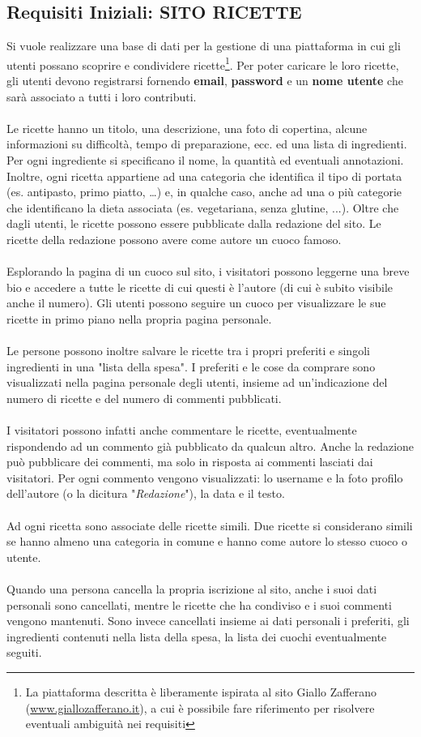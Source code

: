 \documentclass[12pt]{extarticle}
\begin{document}
\subsection{Requisiti Iniziali: SITO RICETTE}
Si vuole realizzare una base di dati per la gestione di una piattaforma in cui gli utenti possano
scoprire e condividere ricette\footnote{La piattaforma descritta è liberamente ispirata al sito Giallo Zafferano 
(\url{www.giallozafferano.it}), a cui è possibile fare riferimento per risolvere eventuali ambiguità nei requisiti}.
Per poter caricare le loro ricette, gli utenti devono registrarsi
fornendo \textbf{email}, \textbf{password} e un \textbf{nome utente} che sarà associato a tutti i loro contributi.
\\\\
Le ricette hanno un titolo, una descrizione, una foto di copertina, alcune informazioni su difficoltà,
tempo di preparazione, ecc. ed una lista di ingredienti. Per ogni ingrediente si
specificano il nome, la quantità ed eventuali annotazioni. Inoltre, ogni ricetta appartiene ad una
categoria che identifica il tipo di portata (es. antipasto, primo piatto, \dots) e, in qualche caso, anche
ad una o più categorie che identificano la dieta associata (es. vegetariana, senza glutine, ...). Oltre
che dagli utenti, le ricette possono essere pubblicate dalla redazione del sito. Le ricette della
redazione possono avere come autore un cuoco famoso.
\\\\
Esplorando la pagina di un cuoco sul sito, i visitatori possono leggerne una
breve bio e accedere a tutte le ricette di cui questi è l'autore (di cui è subito visibile anche il
numero). Gli utenti possono seguire un cuoco per visualizzare le sue ricette in primo piano nella
propria pagina personale.
\\\\
Le persone possono inoltre salvare le ricette tra i propri preferiti e singoli ingredienti in una "lista
della spesa". I preferiti e le cose da comprare sono visualizzati nella pagina personale degli utenti,
insieme ad un'indicazione del numero di ricette e del numero di commenti pubblicati.
\\\\
I visitatori possono infatti anche commentare le ricette, eventualmente rispondendo ad un
commento già pubblicato da qualcun altro. Anche la redazione può pubblicare dei commenti, ma
solo in risposta ai commenti lasciati dai visitatori. Per ogni commento vengono visualizzati: lo
username e la foto profilo dell'autore (o la dicitura "\textit{Redazione}"), la data e il testo.
\\\\
Ad ogni ricetta sono associate delle ricette simili. Due ricette si considerano simili se hanno
almeno una categoria in comune e hanno come autore lo stesso cuoco o utente.
\\\\
Quando una persona cancella la propria iscrizione al sito, anche i suoi dati personali sono
cancellati, mentre le ricette che ha condiviso e i suoi commenti vengono mantenuti. Sono invece
cancellati insieme ai dati personali i preferiti, gli ingredienti contenuti nella lista della spesa, la lista
dei cuochi eventualmente seguiti.
\end{document}
